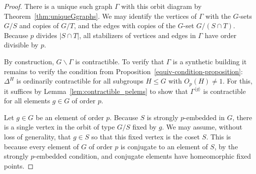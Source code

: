\documentclass[12pt]{amsart}
\theoremstyle{plain}
\theoremstyle{definition}
\theoremstyle{remark}
\numberwithin{equation}{section}
\newcommand{\bs}{\backslash}
\begin{document}
\begin{proof}
There is a unique such graph $\Gamma$ with this orbit diagram by Theorem~\ref{thm:uniqueGgraphs}. We may identify the vertices of $\Gamma$ with the $G$-sets $G/S$ and copies of $G/T$, and the edges with copies of the $G$-set $G/(S\cap T)$. Because $p$ divides $|S\cap T|$, all stabilizers of vertices and edges in $\Gamma$ have order divisible by $p$. 

By construction, $G\bs\Gamma$ is contractible. To verify that $\Gamma$ is a synthetic building it remains to verify the condition from Proposition~\ref{equiv-condition-proposition}: $\Delta^H$ is ordinarily contractible for all subgroups $H\le G$ with $O_p(H)\ne 1$. For this, it suffices by Lemma~\ref{lem:contractible_pelems} to show that $\Gamma^{\langle g\rangle}$ is contractible for all elements $g\in G$ of order $p$. 
    
Let $g\in G$ be an element of order $p$.  Because $S$ is strongly $p$-embedded in $G$, there is a single vertex in the orbit of type $G/S$ fixed by $g$. We may assume, without loss of generality, that $g\in S$ so that this fixed vertex is the coset $S$. This is because every element of $G$ of order $p$ is conjugate to an element of $S$, by the strongly $p$-embedded condition, and conjugate elements have homeomorphic fixed points.


\end{proof}
\end{document}
